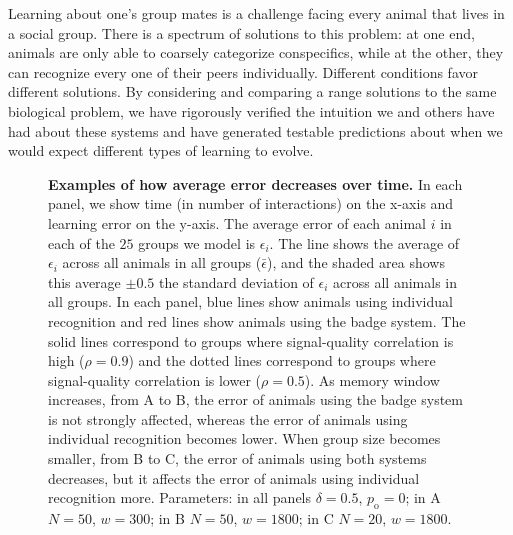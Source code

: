 Learning about one's group mates is a challenge facing every animal that lives in a social group. There is a spectrum of solutions to this problem: at one end, animals are only able to coarsely categorize conspecifics, while at the other, they can recognize every one of their peers individually. Different conditions favor different solutions. By considering and comparing a range solutions to the same biological problem, we have rigorously verified the intuition we and others have had about these systems and have generated testable predictions about when we would expect different types of learning to evolve. 
  

\newpage



\newpage
\begin{figure}
\caption{\label{learning_curves} \sffamily\small\textbf{Examples of how average error decreases over time.}
In each panel, we show time (in number of interactions) on the x-axis and learning error on the y-axis. The average error of each animal $i$ in each of the $25$ groups we model is $\epsilon_i$. The line shows the average of $\epsilon_i$ across all animals in all groups ($\bar{\epsilon}$), and the shaded area shows this average $\pm 0.5$ the standard deviation of $\epsilon_i$ across all animals in all groups. In each panel, blue lines show animals using individual recognition and red lines show animals using the badge system. The solid lines correspond to groups where signal-quality correlation is high ($\rho=0.9$) and the dotted lines correspond to groups where signal-quality correlation is lower ($\rho=0.5$). As memory window increases, from A to B, the error of animals using the badge system is not strongly affected, whereas the error of animals using individual recognition becomes lower. When group size becomes smaller, from B to C, the error of animals using both systems decreases, but it affects the error of animals using individual recognition more.  Parameters: in all panels $\delta = 0.5$, $p_\text{o}=0$; in A $N=50$, $w=300$; in B $N=50$, $w=1800$; in C $N=20$, $w=1800$. }
\end{figure}


